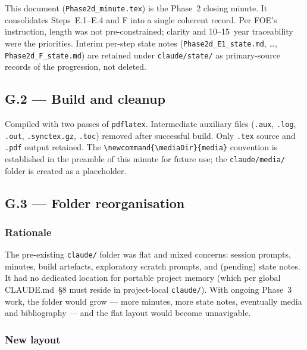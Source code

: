 \documentclass[11pt,a4paper]{article}
\begin{document}
This document (\texttt{Phase2d\_minute.tex}) is the Phase~2 closing minute. It consolidates Steps~E.1--E.4 and F into a single coherent record. Per FOE's instruction, length was not pre-constrained; clarity and 10--15~year traceability were the priorities. Interim per-step state notes (\texttt{Phase2d\_E1\_state.md}, \ldots, \texttt{Phase2d\_F\_state.md}) are retained under \texttt{claude/state/} as primary-source records of the progression, not deleted.

\subsection{G.2 --- Build and cleanup}

Compiled with two passes of \texttt{pdflatex}. Intermediate auxiliary files (\texttt{.aux}, \texttt{.log}, \texttt{.out}, \texttt{.synctex.gz}, \texttt{.toc}) removed after successful build. Only \texttt{.tex} source and \texttt{.pdf} output retained. The \texttt{\textbackslash newcommand\{\textbackslash mediaDir\}\{media\}} convention is established in the preamble of this minute for future use; the \texttt{claude/media/} folder is created as a placeholder.

\subsection{G.3 --- Folder reorganisation}

\subsubsection{Rationale}

The pre-existing \texttt{claude/} folder was flat and mixed concerns: session prompts, minutes, build artefacts, exploratory scratch prompts, and (pending) state notes. It had no dedicated location for portable project memory (which per global CLAUDE.md~§8 must reside in project-local \texttt{claude/}). With ongoing Phase~3 work, the folder would grow --- more minutes, more state notes, eventually media and bibliography --- and the flat layout would become unnavigable.

\subsubsection{New layout}
\end{document}
